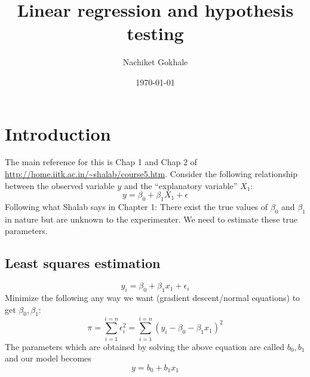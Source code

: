 \documentclass{article}
\newcommand{\beq}{\begin{equation}}
\newcommand{\eeq}{\end{equation}}
\begin{document}
\title{Linear regression and hypothesis testing}
\author{Nachiket Gokhale}
\date{\today}
\maketitle
\section{Introduction}
The main reference for this is Chap 1 and Chap 2 of \url{http://home.iitk.ac.in/~shalab/course5.htm}. Consider the following relationship between the observed variable $y$ and the ``explanatory variable'' $X_1$:
\beq
y = \beta_0 + \beta_1X_1 + \epsilon
\eeq
Following what Shalab says in Chapter 1: There exist the true values of $\beta_0$ and $\beta_1$ in nature but are unknown to the experimenter. We need to estimate these true parameters.
\subsection{Least squares estimation}
\beq
y_i = \beta_0 + \beta_1x_1 + \epsilon_i
\eeq
Minimize the following any way we want (gradient descent/normal equations) to get $\beta_0,\beta_1$:
\beq
\pi = \sum_{i=1}^{i=n}\epsilon_i^2 = \sum_{i=1}^{i=n}(y_i - \beta_0 - \beta_1x_1)^2
\eeq
The parameters which are obtained by solving the above equation are called $b_0,b_1$ and our model becomes
\beq
y = b_0 + b_1x_1
\eeq
\end{document}
